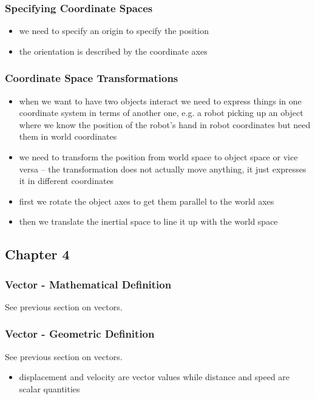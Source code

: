\documentclass[a4paper,11pt]{amsart}
\begin{document}
\subsubsection{Specifying Coordinate Spaces}
\begin{itemize}
    \item we need to specify an origin to specify the position
    \item the orientation is described by the coordinate axes
\end{itemize}

\subsubsection{Coordinate Space Transformations}
\begin{itemize}
    \item when we want to have two objects interact we need to express things
        in one coordinate system in terms of another one, e.g. a robot picking
        up an object where we know the position of the robot's hand in robot
        coordinates but need them in world coordinates
    \item we need to transform the position from world space to object space or
        vice versa -- the transformation does not actually move anything, it
        just expresses it in different coordinates
    \item first we rotate the object axes to get them parallel to the world
        axes
    \item then we translate the inertial space to line it up with the world
        space
\end{itemize}

\subsection{Chapter 4}

\subsubsection{Vector - Mathematical Definition}
See previous section on vectors.
\subsubsection{Vector - Geometric Definition}
See previous section on vectors.
\begin{itemize}
    \item displacement and velocity are vector values while distance and speed
        are scalar quantities
\end{itemize}
\end{document}
